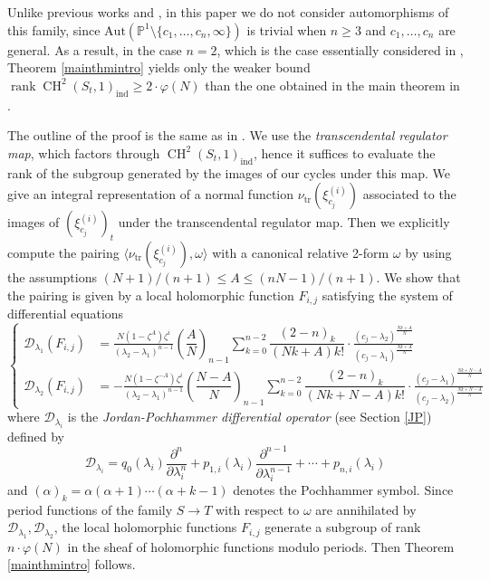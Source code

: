 \documentclass[letterpaper, 11pt]{amsart}
\theoremstyle{my theoremstyle}
\theoremstyle{dfn}
\theoremstyle{remark}
\renewcommand{\1}{\mathbbm{1}}
\renewcommand{\P}{\mathbb{P}}
\renewcommand{\a}{\alpha}
\renewcommand{\l}{\lambda}
\newcommand{\ch}{\operatorname{CH}}
\numberwithin{equation}{section}
\begin{document}
Unlike previous works \cite{NS} and \cite{Sato}, in this paper we do not consider automorphisms of this family, since $\mathrm{Aut}(\P^1\setminus \{c_1,\dots,c_n,\infty\})$ is trivial when $n\ge 3$ and $c_1,\dots, c_n$ are general.
As a result, in the case $n=2$, which is the case essentially considered in \cite{NS}, Theorem \ref{mainthmintro} yields only the weaker bound $\operatorname{rank} \ch^2(S_t,1)_{\mathrm{ind}}\geq 2\cdot\varphi(N)$ than the one obtained in the main theorem in \cite{NS}.

The outline of the proof is the same as in \cite{NS}.
We use the {\it transcendental regulator map}, which factors through $\ch^2(S_t, 1)_{\mathrm{ind}}$, hence it suffices to evaluate the rank of the subgroup generated by the images of our cycles under this map.
We give an integral representation of a normal function $\nu_{\mathrm{tr}}(\xi_{c_j}^{(i)})$ associated to the images of $(\xi_{c_j}^{(i)})_t$ under the transcendental regulator map.
Then we explicitly compute the pairing $\langle \nu_{\mathrm{tr}}(\xi_{c_j}^{(i)}), \omega\rangle$ with a canonical relative 2-form $\omega$ by using the assumptions $(N+1)/(n+1) \leq A \leq (nN-1)/(n+1)$.
We show that the pairing is given by a local holomorphic function $F_{i, j}$ satisfying the system of differential equations
\begin{equation*}
\left\{
\begin{aligned}
\mathscr{D}_{\l_1}(F_{i, j}) &= \frac{N(1-\zeta^A)\zeta^i}{(\l_2-\l_1)^{n-1}} \left(\dfrac{A}N\right)_{n-1}
\displaystyle  \sum_{k=0}^{n-2}  \dfrac{(2-n)_k}{(Nk+A)k!}\cdot 
\frac{(c_j-\l_2)^{\frac{Nk+A}{N}}}{(c_j-\l_1)^{\frac{Nk+A}{N}}}\\
\mathscr{D}_{\l_2}(F_{i, j}) &=-\frac{N(1-\zeta^{-A})\zeta^i}{(\l_2-\l_1)^{n-1}} \left(\dfrac{N-A}N\right)_{n-1}
\displaystyle  \sum_{k=0}^{n-2}  \dfrac{(2-n)_k}{(Nk+N-A)k!}\cdot 
\frac{(c_j-\l_1)^{\frac{Nk+N-A}{N}}}{(c_j-\l_2)^{\frac{Nk+N-A}{N}}}
\end{aligned}
\right.
\end{equation*}
where $\mathscr{D}_{\l_i}$ is the \textit{Jordan-Pochhammer differential operator} (see Section \ref{JP}) defined by
$$
\mathscr{D}_{\l_i}=q_0(\l_i) \dfrac{\partial^n}{\partial\l_i^n}+p_{1,i}(\l_i) \dfrac{\partial^{n-1}}{\partial\l_i^{n-1}}+\cdots + p_{n,i}(\l_i)$$
and $(\a)_k=\a(\a+1) \cdots (\a + k-1)$ denotes the Pochhammer symbol.
Since period functions of the family $S\to T$ with respect to $\omega$  are annihilated by $\mathscr{D}_{\l_1}, \mathscr{D}_{\l_2}$, the local holomorphic functions $F_{i, j}$ generate a subgroup of rank $n\cdot \varphi(N)$ in the sheaf of holomorphic functions modulo periods.
Then Theorem \ref{mainthmintro} follows.
\end{document}
